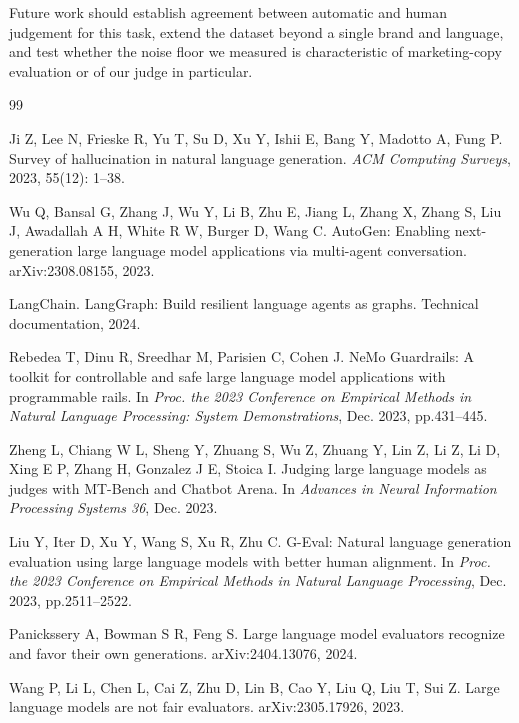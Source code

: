 \documentclass[9pt,twocolumn]{extarticle}
\begin{document}
Future work should establish agreement between automatic and human judgement
for this task, extend the dataset beyond a single brand and language, and test
whether the noise floor we measured is characteristic of marketing-copy
evaluation or of our judge in particular.

\balance

\begin{thebibliography}{99}
\footnotesize

Ji Z, Lee N, Frieske R, Yu T, Su D, Xu Y, Ishii E, Bang Y, Madotto A, Fung P.
Survey of hallucination in natural language generation. \textit{ACM Computing
Surveys}, 2023, 55(12): 1--38.

Wu Q, Bansal G, Zhang J, Wu Y, Li B, Zhu E, Jiang L, Zhang X, Zhang S, Liu J,
Awadallah A H, White R W, Burger D, Wang C. AutoGen: Enabling next-generation
large language model applications via multi-agent conversation. arXiv:2308.08155,
2023.

LangChain. LangGraph: Build resilient language agents as graphs. Technical
documentation, 2024.

Rebedea T, Dinu R, Sreedhar M, Parisien C, Cohen J. NeMo Guardrails: A toolkit
for controllable and safe large language model applications with programmable
rails. In \textit{Proc. the 2023 Conference on Empirical Methods in Natural
Language Processing: System Demonstrations}, Dec. 2023, pp.431--445.

Zheng L, Chiang W L, Sheng Y, Zhuang S, Wu Z, Zhuang Y, Lin Z, Li Z, Li D,
Xing E P, Zhang H, Gonzalez J E, Stoica I. Judging large language models as
judges with MT-Bench and Chatbot Arena. In \textit{Advances in Neural
Information Processing Systems 36}, Dec. 2023.

Liu Y, Iter D, Xu Y, Wang S, Xu R, Zhu C. G-Eval: Natural language generation
evaluation using large language models with better human alignment. In
\textit{Proc. the 2023 Conference on Empirical Methods in Natural Language
Processing}, Dec. 2023, pp.2511--2522.

Panickssery A, Bowman S R, Feng S. Large language model evaluators recognize
and favor their own generations. arXiv:2404.13076, 2024.

Wang P, Li L, Chen L, Cai Z, Zhu D, Lin B, Cao Y, Liu Q, Liu T, Sui Z. Large
language models are not fair evaluators. arXiv:2305.17926, 2023.


\end{thebibliography}
\end{document}
